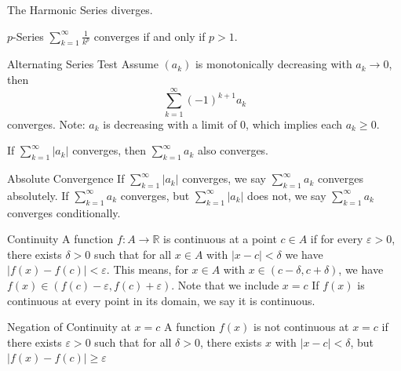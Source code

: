 \documentclass[12pt]{article}
\begin{document}
\begin{proposition}{}{}
    The Harmonic Series diverges.
\end{proposition}
\begin{proposition}{$ p $-Series}{}
    $ \sum_{k = 1}^\infty \frac{1}{k^p} $ converges if and only if $ p > 1 $.
\end{proposition}
\begin{proposition}{Alternating Series Test}{}
    Assume $ \left( a_k \right) $ is monotonically decreasing with $ a_k \to 0 $, then
    \[ \sum_{k = 1}^\infty \left( -1 \right)^{k + 1} a_k \]
    converges.
    \medskip
    \newline
    Note: $ a_k $ is decreasing with a limit of 0, which implies each $ a_k \geq 0 $.
\end{proposition}
\begin{proposition}{}{}
    If $ \sum_{k = 1}^\infty | a_k | $ converges, then $ \sum_{k = 1}^\infty a_k $ also converges.
\end{proposition}
\begin{definition}{Absolute Convergence}{}
    If $ \sum_{k = 1}^\infty | a_k | $ converges, we say $ \sum_{k = 1}^\infty a_k $ converges absolutely.
    \medskip
    \newline
    If $ \sum_{k = 1}^\infty a_k $ converges, but $ \sum_{k = 1}^\infty | a_k | $ does not, we say $ \sum_{k = 1}^\infty a_k $ converges conditionally.
\end{definition}
\begin{definition}{Continuity}{}
    A function $ f: A \to \mathbb{R} $ is continuous at a point $ c \in A $ if for every $ \varepsilon > 0 $, there exists $ \delta > 0 $ such that for all $ x \in A $ with $ | x - c | < \delta $ we have $ | f \left( x \right) - f \left( c \right) | < \varepsilon $.
    \medskip
    \newline
    This means, for $ x \in A $ with $ x \in \left( c - \delta, c + \delta \right) $, we have $ f \left( x \right) \in \left( f \left( c \right) - \varepsilon, f \left( c  \right) + \varepsilon \right) $. Note that we include $ x = c $
    \medskip
    \newline
    If $ f \left( x \right) $ is continuous at every point in its domain, we say it is continuous.
\end{definition}
\begin{definition}{Negation of Continuity at $ x = c $}{}
    A function $ f \left( x \right) $ is not continuous at $ x = c $ if there exists $ \varepsilon > 0 $ such that for all $ \delta > 0 $, there exists $ x $ with $ | x - c | < \delta $, but $ | f \left( x \right) - f \left( c \right) | \geq \varepsilon $
\end{definition}
\end{document}
